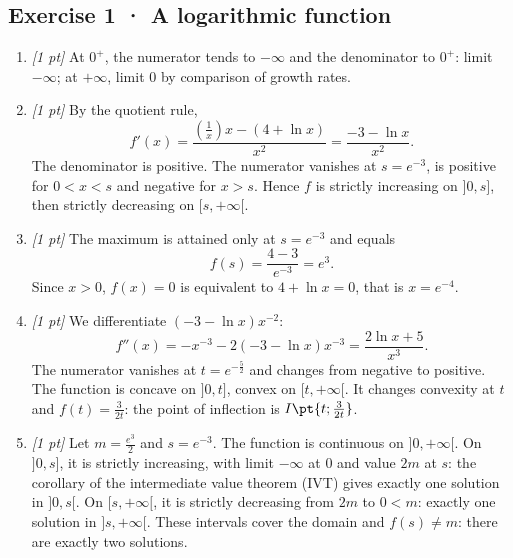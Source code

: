 \subsection*{Exercise 1 · A logarithmic function}\begin{enumerate}

\item \textit{[1 pt]} At $0^+$, the numerator tends to $-\infty$ and the denominator to $0^+$: limit $-\infty$; at $+\infty$, limit $0$ by comparison of growth rates.

\item \textit{[1 pt]} By the quotient rule,
\[f'(x)=\frac{(\frac{1}{x})x-(4+\ln x)}{x^2}=\frac{-3-\ln x}{x^2}.\]
The denominator is positive. The numerator vanishes at $s=e^{-3}$, is positive for $0<x<s$ and negative for $x>s$. Hence $f$ is strictly increasing on $]0,s]$, then strictly decreasing on $[s,+\infty[$.

\item \textit{[1 pt]} The maximum is attained only at $s=e^{-3}$ and equals
\[f(s)=\frac{4- 3}{e^{-3}}=e^{3}.\]
Since $x>0$, $f(x)=0$ is equivalent to $4+\ln x=0$, that is $x=e^{-4}$.

\item \textit{[1 pt]} We differentiate $(-3-\ln x)x^{-2}$:
\[f''(x)=-x^{-3}-2(-3-\ln x)x^{-3}=\frac{2\ln x+5}{x^3}.\]
The numerator vanishes at $t=e^{-\frac{5}{2}}$ and changes from negative to positive. The function is concave on $]0,t]$, convex on $[t,+\infty[$. It changes convexity at $t$ and $f(t)=\frac{3}{2t}$: the point of inflection is $I\pt{t;\frac{3}{2t}}$.

\item \textit{[1 pt]} Let $m=\frac{e^{3}}{2}$ and $s=e^{-3}$. The function is continuous on $]0,+\infty[$. On $]0,s]$, it is strictly increasing, with limit $-\infty$ at $0$ and value $2m$ at $s$: the corollary of the intermediate value theorem (IVT) gives exactly one solution in $]0,s[$. On $[s,+\infty[$, it is strictly decreasing from $2m$ to $0<m$: exactly one solution in $]s,+\infty[$. These intervals cover the domain and $f(s)\ne m$: there are exactly two solutions.

\end{enumerate}

